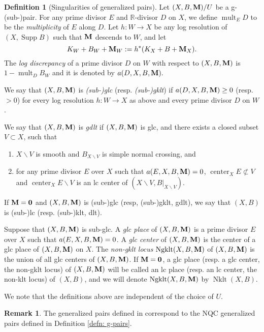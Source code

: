 \documentclass[11pt]{amsart}
\numberwithin{equation}{section}
\newcommand{\Mm}{{\bf{M}}}
\newcommand{\Center}{\operatorname{center}}
\newcommand{\Nklt}{\operatorname{Nklt}}
\newcommand{\Supp}{\operatorname{Supp}}
\newcommand{\Ngklt}{\operatorname{Ngklt}}
\newcommand{\mult}{\operatorname{mult}}
\theoremstyle{definition}
\newtheorem{defn}[thm]{Definition}
\theoremstyle{definition}
\newtheorem{rem}[thm]{Remark}
\theoremstyle{definition}
\begin{document}
\begin{defn}[Singularities of generalized pairs]\label{defn: sing of g-pairs}
	Let $(X,B,\Mm)/U$ be a g-(sub-)pair. For any prime divisor $E$ and $\mathbb R$-divisor $D$ on $X$, we define $\mult_{E}D$ to be the \emph{multiplicity} of $E$ along $D$.  Let $h:W\to X$
	be any log resolution of $(X,\Supp B)$ such that $\Mm$ descends to $W$, and let
	$$K_W+B_W+\Mm_W:=h^*(K_X+B+\Mm_X).$$
	The \emph{log discrepancy} of a prime divisor $D$ on $W$ with respect to $(X,B,\Mm)$ is $1-\mult_{D}B_W$ and it is denoted by $a(D,X,B,\Mm).$
	
	We say that $(X,B,\Mm)$ is \emph{(sub-)glc} (resp. \emph{(sub-)gklt}) if $a(D,X,B,\Mm)\ge0$ (resp. $>0$) for every log resolution $h: W\to X$ as above and every prime divisor $D$ on $W$. 
	
	We say that $(X,B,\Mm)$ is \emph{gdlt} if $(X,B,\Mm)$ is glc, and there exists a closed subset $V\subset X$, such that
\begin{enumerate}
    \item $X\backslash V$ is smooth and $B_{X\backslash V}$ is simple normal crossing, and
    \item for any prime divisor $E$ over $X$ such that $a(E,X,B,\Mm)=0$, $\Center_XE\not\subset V$ and $\Center_XE\backslash V$ is an lc center of $(X\backslash V,B|_{X\backslash V})$.
\end{enumerate}
If $\Mm=\bm{0}$ and $(X,B,\Mm)$ is (sub-)glc (resp, (sub-)gklt, gdlt), we say that $(X,B)$ is (sub-)lc (resp. (sub-)klt, dlt).
	    
	 Suppose that $(X,B,\Mm)$ is sub-glc. A \emph{glc place} of $(X,B,\Mm)$ is a prime divisor $E$ over $X$ such that $a(E,X,B,\Mm)=0$. A \emph{glc center} of $(X,B,\Mm)$ is the center of a glc place of $(X,B,\Mm)$ on $X$. The \emph{non-gklt locus} $\Ngklt(X,B,\Mm)$ of $(X,B,\Mm)$ is the union of all glc centers of $(X,B,\Mm)$. If $\Mm=\bm{0}$, a glc place (resp. a glc center, the non-gklt locus) of $(X,B,\Mm)$ will be called an lc place (resp. an lc center, the non-klt locus) of $(X,B)$, and we will denote $\Ngklt(X,B,\Mm)$ by $\Nklt(X,B)$. 
	 
	 We note that the definitions above are independent of the choice of $U$.
\end{defn}

\begin{rem}\label{rem: difference in definition of g-pair}
The generalized pairs defined in \cite{BZ16} correspond to the NQC generalized pairs defined in Definition \ref{defn: g-pairs}.
\end{rem}
\end{document}
